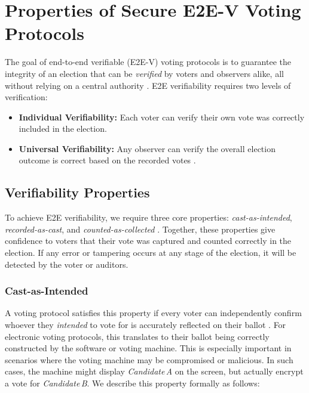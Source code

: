 \section{Properties of Secure E2E-V Voting Protocols}
\label{e2e-v-properties}
The goal of end-to-end verifiable (E2E-V) voting protocols is to guarantee the integrity of an election that can be \emph{verified} by voters and observers alike, all without relying on a central authority \cite{Cha02,kremer2010election,Ben87}.
E2E verifiability requires two levels of verification: 

\begin{itemize}
    \item \textbf{Individual Verifiability:} Each voter can verify their own vote was correctly included in the election.
    \item \textbf{Universal Verifiability:} Any observer can verify the overall election outcome is correct based on the recorded votes \cite{DBLP:journals/corr/AliM16}.
\end{itemize}

\subsection{Verifiability Properties}
\label{sec:verifiability_properties}
To achieve E2E verifiability, we require three core properties: \emph{cast-as-intended}, \emph{recorded-as-cast}, and \emph{counted-as-collected} \cite{regenscheid-e2e-vvsg2-tgdc-2023}.
Together, these properties give confidence to voters that their vote was captured and counted correctly in the election.  
If any error or tampering occurs at any stage of the election, it will be detected by the voter or auditors. 

\subsubsection{Cast-as-Intended}
A voting protocol satisfies this property if every voter can independently confirm whoever they \emph{intended} to vote for is accurately reflected on their ballot \cite{RonneRyanSmyth2021}. 
For electronic voting protocols, this translates to their ballot being correctly constructed by the software or voting machine.
This is especially important in scenarios where the voting machine may be compromised or malicious.
In such cases, the machine might display \emph{Candidate\,A} on the screen, but actually encrypt a vote for \emph{Candidate\,B}.
We describe this property formally as follows:

